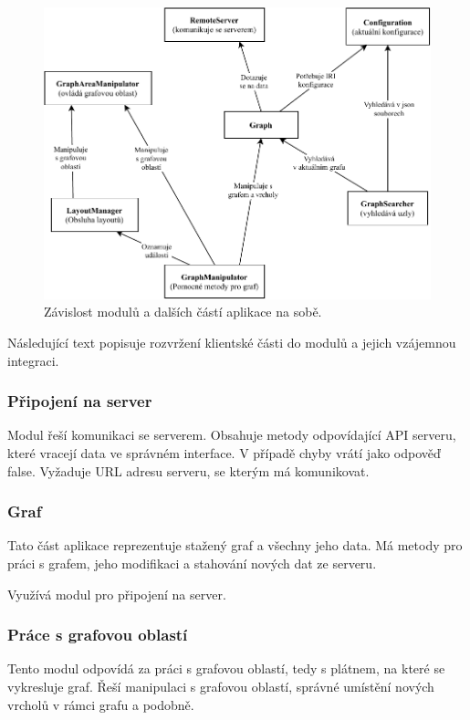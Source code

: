 \begin{figure}[h]
    \centering
    \includegraphics[width=\textwidth]{media/dependencies.pdf}
    \caption{Závislost modulů a dalších částí aplikace na sobě. }
\end{figure}

Následující text popisuje rozvržení klientské části do modulů a jejich vzájemnou integraci.

\subsubsection{Připojení na server}
Modul řeší komunikaci se serverem. Obsahuje metody odpovídající API serveru, které vracejí data ve správném interface. V případě chyby vrátí jako odpověď false. Vyžaduje URL adresu serveru, se kterým má komunikovat.

\subsubsection{Graf}
Tato část aplikace reprezentuje stažený graf a všechny jeho data. Má metody pro práci s grafem, jeho modifikaci a stahování nových dat ze serveru.

Využívá modul pro připojení na server.

\subsubsection{Práce s grafovou oblastí}
Tento modul odpovídá za práci s grafovou oblastí, tedy s plátnem, na které se vykresluje graf. Řeší manipulaci s grafovou oblastí, správné umístění nových vrcholů v rámci grafu a podobně.

